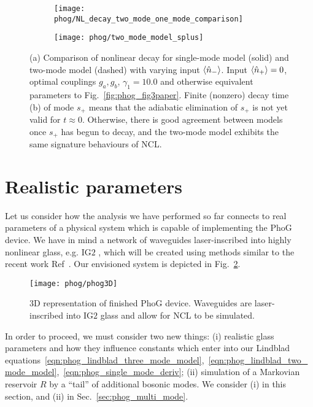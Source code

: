 \begin{figure}[htp]
\captionsetup{width=\linewidth}
\centering
	\begin{subfigure}{0.7\linewidth}
	\caption{}
	\texttt{[image: phog/NL\_decay\_two\_mode\_one\_mode\_comparison]}
	\end{subfigure}
	\begin{subfigure}{0.7\linewidth}
	\centering
	\caption{}
	\texttt{[image: phog/two\_mode\_model\_splus]}
	\end{subfigure}
\caption{\label{fig:phog_two_mode_single_mode_comparison} (a) Comparison of nonlinear decay for single-mode model (solid) and two-mode model (dashed) with varying input $\ev{\hat{n}_-}$. Input $\ev{\hat{n}_+} = 0$, optimal couplings $g_a, g_b$, $\gamma_1 = 10.0$ and otherwise equivalent parameters to Fig.~\ref{fig:phog_fig3paper}. Finite (nonzero) decay time (b) of mode $s_+$ means that the adiabatic elimination of $s_+$ is not yet valid for $t \approx 0$. Otherwise, there is good agreement between models once $s_+$ has begun to decay, and the two-mode model exhibits the same signature behaviours of NCL.}
\end{figure}

\clearpage
\section{Realistic parameters}\label{sec:parameters}

Let us consider how the analysis we have performed so far connects to real parameters of a physical system which is capable of implementing the PhoG device. We have in mind a network of waveguides laser-inscribed into highly nonlinear glass, e.g. IG$2$ \cite{ig2}, which will be created using methods similar to the recent work Ref~\cite{Mukherjee2017}. Our envisioned system is depicted in Fig.~\ref{fig:phog_realistic}.

\begin{figure}[htp]
\captionsetup{width=\linewidth}
\centering
\texttt{[image: phog/phog3D]}
\caption{\label{fig:phog_realistic} $3$D representation of finished PhoG device. Waveguides are laser-inscribed into IG$2$ glass and allow for NCL to be simulated.}
\end{figure}

In order to proceed, we must consider two new things: (i) realistic glass parameters and how they influence constants which enter into our Lindblad equations~\ref{eqn:phog_lindblad_three_mode_model},~\ref{eqn:phog_lindblad_two_mode_model},~\ref{eqn:phog_single_mode_deriv}; (ii) simulation of a Markovian reservoir $R$ by a ``tail'' of additional bosonic modes. We consider (i) in this section, and (ii) in Sec.~\ref{sec:phog_multi_mode}.

